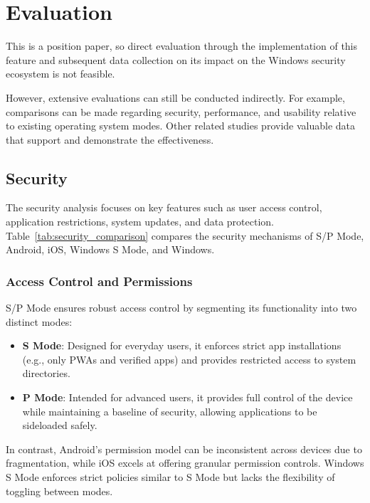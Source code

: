 \section{Evaluation}
\label{sec:eval}

This is a position paper, so direct evaluation through the implementation of this feature and subsequent data collection on its impact on the Windows security ecosystem is not feasible.

However, extensive evaluations can still be conducted indirectly. For example, comparisons can be made regarding security, performance, and usability relative to existing operating system modes. Other related studies provide valuable data that support and demonstrate the effectiveness.


\subsection{Security}

The security analysis focuses on key features such as user access control, application restrictions, system updates, and data protection. Table~\ref{tab:security_comparison} compares the security mechanisms of S/P Mode, Android, iOS, Windows S Mode, and Windows.

\subsubsection{Access Control and Permissions}
S/P Mode ensures robust access control by segmenting its functionality into two distinct modes:
\begin{itemize}
    \item \textbf{S Mode}: Designed for everyday users, it enforces strict app installations (e.g., only PWAs and verified apps) and provides restricted access to system directories.
    \item \textbf{P Mode}: Intended for advanced users, it provides full control of the device while maintaining a baseline of security, allowing applications to be sideloaded safely.
\end{itemize}
In contrast, Android's permission model can be inconsistent across devices due to fragmentation, while iOS excels at offering granular permission controls. Windows S Mode enforces strict policies similar to S Mode but lacks the flexibility of toggling between modes.

